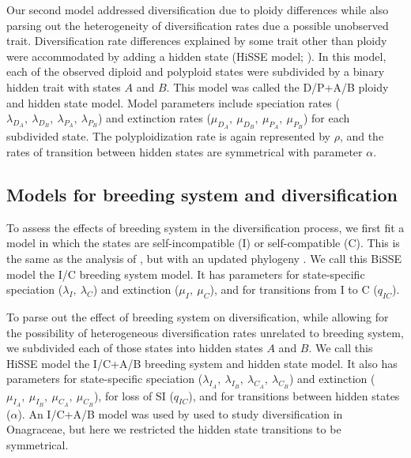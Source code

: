 Our second model addressed diversification due to ploidy differences while also parsing out the heterogeneity of diversification rates due a possible unobserved trait.
Diversification rate differences explained by some trait other than ploidy were accommodated by adding a hidden state (HiSSE model; \citealt{beaulieu_2016}). %
In this model, each of the observed diploid and polyploid states were subdivided by a binary hidden trait with states $A$ and $B$.
This model was called the D/P+A/B ploidy and hidden state model. 
Model parameters include speciation rates ($\lambda_{D_A},\ \lambda_{D_B},\ \lambda_{P_A},\ \lambda_{P_B}$) and extinction rates ($\mu_{D_A},\ \mu_{D_B},\ \mu_{P_A},\ \mu_{P_B}$) for each subdivided state.
The polyploidization rate is again represented by $\rho$, and the rates of transition between hidden states are symmetrical with parameter $\alpha$.

\subsection{Models for breeding system and diversification}

To assess the effects of breeding system in the diversification process, we first fit a model in which the states are self-incompatible (I) or self-compatible (C).
This is the same as the analysis of \citet{goldberg_2010}, but with an updated phylogeny \citep{sarkinen_2013}.
We call this BiSSE model the I/C breeding system model. 
It has parameters for state-specific speciation ($\lambda_I,\ \lambda_C$) and extinction ($\mu_I,\ \mu_C$), and for transitions from I to C ($q_{IC}$).

To parse out the effect of breeding system on diversification, while allowing for the possibility of heterogeneous diversification rates unrelated to breeding system, we subdivided each of those states into hidden states $A$ and $B$.
We call this HiSSE model the I/C+A/B breeding system and hidden state model.
It also has parameters for state-specific speciation ($\lambda_{I_A},\ \lambda_{I_B},\ \lambda_{C_A},\ \lambda_{C_B}$) and extinction ($\mu_{I_A},\ \mu_{I_B},\ \mu_{C_A},\ \mu_{C_B}$), for loss of SI ($q_{IC}$), and for transitions between hidden states ($\alpha$).
An I/C+A/B model was used by \citet{freyman_2017} used to study diversification in Onagraceae, but here we restricted the hidden state transitions to be symmetrical. 

